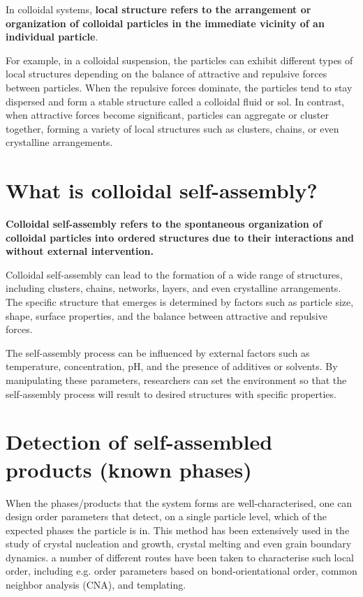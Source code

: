 \documentclass{report}
\begin{document}
In colloidal systems, \textbf{local structure refers to the arrangement or organization of colloidal particles in the immediate vicinity of an individual particle}.

For example, in a colloidal suspension, the particles can exhibit different types of local structures depending on the balance of attractive and repulsive forces between particles. When the repulsive forces dominate, the particles tend to stay dispersed and form a stable structure called a colloidal fluid or sol. In contrast, when attractive forces become significant, particles can aggregate or cluster together, forming a variety of local structures such as clusters, chains, or even crystalline arrangements.

\section{What is colloidal self-assembly?}

\textbf{Colloidal self-assembly refers to the spontaneous organization of colloidal particles into ordered structures due to their interactions and without external intervention.}

Colloidal self-assembly can lead to the formation of a wide range of structures, including clusters, chains, networks, layers, and even crystalline arrangements. The specific structure that emerges is determined by factors such as particle size, shape, surface properties, and the balance between attractive and repulsive forces.

The self-assembly process can be influenced by external factors such as temperature, concentration, pH, and the presence of additives or solvents. By manipulating these parameters, researchers can set the environment so that the self-assembly process will result to desired structures with specific properties.

\section{Detection of self-assembled products (known phases)}



When the phases/products that the system forms are well-characterised, one can design order parameters that detect, on a single particle level, which of the expected phases the particle is in. This method has been extensively used in the study of crystal nucleation and growth, crystal melting and even grain boundary dynamics. a number of different routes have been taken to characterise such local order, including e.g. order parameters based on bond-orientational order, common neighbor analysis (CNA), and templating.
\end{document}
